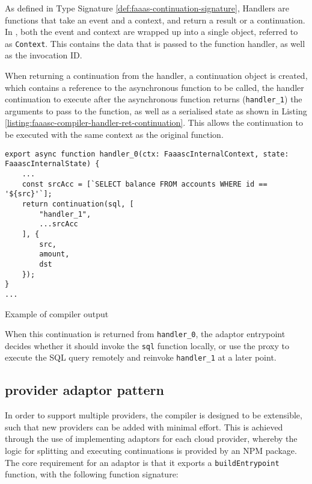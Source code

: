 As defined in Type Signature \ref{def:faaas-continuation-signature}, Handlers are functions that take an event and a context, and return a result or a continuation. In \faaasc{}, both the event and context are wrapped up into a single object, referred to as \verb|Context|. This contains the data that is passed to the function handler, as well as the invocation ID.

When returning a continuation from the handler, a continuation object is created, which contains a reference to the asynchronous function to be called, the handler continuation to execute after the asynchronous function returns (\verb|handler_1|) the arguments to pass to the function, as well as a serialised state as shown in Listing \ref{listing:faaasc-compiler-handler-ret-continuation}. This allows the continuation to be executed with the same context as the original function.

\begin{listing}[H]
\begin{verbatim}
export async function handler_0(ctx: FaaascInternalContext, state: FaaascInternalState) {
    ...
    const srcAcc = [`SELECT balance FROM accounts WHERE id == '${src}'`];
    return continuation(sql, [
        "handler_1",
        ...srcAcc
    ], {
        src,
        amount,
        dst
    });
}
...
\end{verbatim}
\caption{Example of \faaasc{} compiler output}
\label{listing:faaasc-compiler-handler-ret-continuation}
\end{listing}

When this continuation is returned from \verb|handler_0|, the adaptor entrypoint decides whether it should invoke the \verb|sql| function locally, or use the proxy to execute the SQL query remotely and reinvoke \verb|handler_1| at a later point.

\subsection{\faas{} provider adaptor pattern}
In order to support multiple \faas{} providers, the \faaasc{} compiler is designed to be extensible, such that new providers can be added with minimal effort. This is achieved through the use of implementing adaptors for each cloud provider, whereby the logic for splitting and executing continuations is provided by an NPM package. The core requirement for an adaptor is that it exports a \verb|buildEntrypoint| function, with the following function signature:

